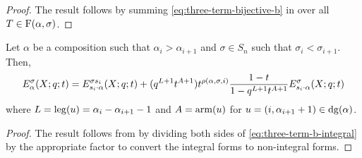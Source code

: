 \begin{proof}
    The result follows by summing \eqref{eq:three-term-bijective-b} in  over all \(T \in \Fill(\alpha, \sigma)\).
\end{proof}

\begin{theorem} \label{thm:three-term-b-non-integral}
    Let \(\alpha\) be a composition such that \(\alpha_i > \alpha_{i+1}\) and \(\sigma \in S_n\) such that \(\sigma_i < \sigma_{i+1}\).
    Then,
    \begin{equation} \label{eq:three-term-b-non-integral}
        E_{\alpha}^\sigma(X;q;t)=E_{s_i \cdot \alpha}^{\sigma s_i}(X;q;t)+(q^{L+1}t^{A+1})t^{\rho(\alpha,\sigma,i)}\frac{1-t}{1-q^{L+1}t^{A+1}}E_{s_i \cdot \alpha}^\sigma(X;q;t)
    \end{equation}
    where \(L = \operatorname{leg}(u) = \alpha_i - \alpha_{i+1} - 1\) and \(A = \operatorname{arm}(u)\) for \(u = (i,\alpha_{i+1} +1)\in\dg(\alpha)\).
\end{theorem}

\begin{proof}
    The result follows from  by dividing both sides of \eqref{eq:three-term-b-integral} by the appropriate factor to convert the integral forms to non-integral forms.
\end{proof}